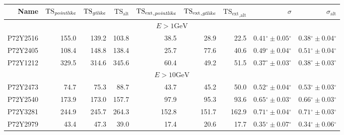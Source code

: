 \documentclass[preprint]{aastex}
\newcommand{\gev}{\text{GeV}\xspace}
\newcommand{\tsext}{{\ensuremath{\text{TS}_\text{ext}}}\xspace}
\newcommand{\tsextpointlike}{\ensuremath{\tsext_{,\pointlike}}}
\newcommand{\tsextgtlike}{\ensuremath{\tsext_{,\gtlike}}}
\newcommand{\tsextalt}{\ensuremath{\tsext_{,\alt}}}
\newcommand{\ts}{\text{TS}\xspace}
\newcommand{\alt}{\text{alt}\xspace}
\renewcommand{\deg}{\ensuremath{^\circ}\xspace}
\newcommand{\pointlike}{\text{\em pointlike}\xspace}
\newcommand{\gtlike}{\text{\em gtlike}\xspace}
\begin{document}
  \clearpage
  \begin{table}
    \begin{centering}
      \begin{tabular}{r|rrrrrrrr}
        \hline
        \hline
        Name                 &     $\ts_\pointlike$ &        $\ts_\gtlike$ &           $\ts_\alt$ &          \tsextpointlike &           \tsextgtlike &            \tsextalt &                    $\sigma$ &               $\sigma_\alt$ \\
        \hline
        \multicolumn{9}{c}{$E > 1\gev$} \\
        \hline
        P72Y2516             &                155.0 &                139.2 &                103.8 &                     38.5 &                   28.9 &                 22.5 & $  0.41\deg \pm   0.05\deg$ & $  0.38\deg \pm   0.04\deg$ \\
        P72Y2405             &                108.4 &                148.8 &                138.4 &                     25.7 &                   77.6 &                 40.6 & $  0.49\deg \pm   0.04\deg$ & $  0.51\deg \pm   0.04\deg$ \\
        P72Y1212             &                329.5 &                314.6 &                345.6 &                     60.4 &                   49.2 &                 51.5 & $  0.37\deg \pm   0.03\deg$ & $  0.38\deg \pm   0.03\deg$ \\
        \hline
        \multicolumn{9}{c}{$E > 10\gev$} \\
        \hline
        P72Y2473             &                 74.7 &                 75.3 &                 88.7 &                     43.7 &                   45.2 &                 50.0 & $  0.52\deg \pm   0.04\deg$ & $  0.53\deg \pm   0.03\deg$ \\
        P72Y2540             &                173.9 &                173.0 &                157.7 &                     97.9 &                   95.3 &                 93.6 & $  0.65\deg \pm   0.03\deg$ & $  0.66\deg \pm   0.03\deg$ \\
        P72Y3281             &                244.9 &                245.7 &                264.3 &                    152.8 &                  151.7 &                162.9 & $  0.71\deg \pm   0.04\deg$ & $  0.71\deg \pm   0.03\deg$ \\
        P72Y2979             &                 43.4 &                 47.3 &                 39.0 &                     17.4 &                   20.6 &                 17.7 & $  0.35\deg \pm   0.07\deg$ & $  0.34\deg \pm   0.06\deg$ \\

\end{tabular}
\end{centering}
\end{table}
\end{document}
